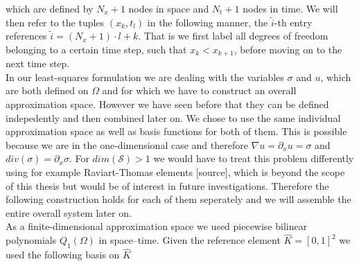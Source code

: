 \documentclass[../draft_1.tex]{subfiles}
\begin{document}
which are defined by $N_x+1$ nodes in space and $N_t+1$ nodes in time. We will then refer to the tuples $(x_k, t_l)$ in the following manner, the $\tilde{i}$-th entry references $\tilde{i} = (N_x+1) \cdot l + k$. That is we first label all degrees of freedom belonging to a certain time step, such that $x_k < x_{k+1}$, before moving on to the next time step. 
\smallskip
\\
In our least-squares formulation we are dealing with the variables $\sigma$ and $u$, which are both defined on $\Omega$ and for which we have to construct an overall approximation space. However we have seen before that they can be defined indepedently and then combined later on. We chose to use the same individual approximation space as well as basis functions for both of them. This is possible because we are in the one-dimensional case and therefore $ \nabla u = \partial_x u = \sigma$ and $div(\sigma) = \partial_{x} \sigma$. For $dim (\mathcal{S}) > 1 $ we would have to treat this problem differently using for example Raviart-Thomas elements [source], which is beyond the scope of this thesis but would be of interest in future investigations. Therefore the following construction holds for each of them seperately and we will assemble the entire overall system later on. 
\smallskip
\\
As a finite-dimensional approximation space we used piecewise bilinear polynomials $Q_1(\Omega)$ in space--time. Given the reference element $\hat{K} = [0,1]^2$ we used the following basis on $\hat{K}$ \\
\end{document}
